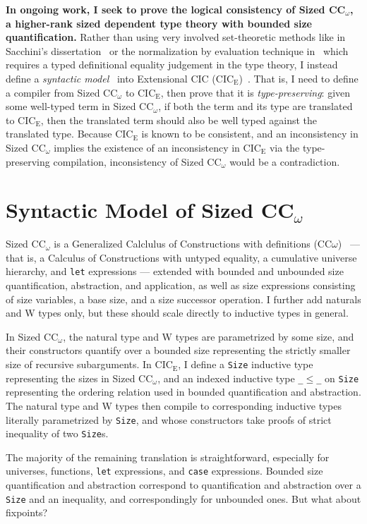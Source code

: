 \documentclass[acmsmall,nonacm, screen]{acmart}
\newcommand{\lang}{Sized CC$_\omega$\xspace}
\newcommand{\CICE}{CIC$_\mathrm{E}$\xspace}
\newcommand{\we}{I\xspace}
\newcommand{\We}{I\xspace}
\begin{document}
\textbf{In ongoing work, \we seek to prove the logical consistency of \lang,
a higher-rank sized dependent type theory with bounded size quantification.}
Rather than using very involved set-theoretic methods like in Sacchini's dissertation~\citep{cic-hat-minus}
or the normalization by evaluation technique in~\citet{nbe-sized}
which requires a typed definitional equality judgement in the type theory,
\we instead define a \emph{syntactic model}~\citep{syntactic-models} into Extensional CIC (\CICE)~\citep{CCE}.
That is, \we need to define a compiler from \lang to \CICE, then prove that it is \emph{type-preserving}:
given some well-typed term in \lang, if both the term and its type are translated to \CICE,
then the translated term should also be well typed against the translated type.
Because \CICE is known to be consistent, and an inconsistency in \lang
implies the existence of an inconsistency in \CICE via the type-preserving compilation,
inconsistency of \lang would be a contradiction.

\section{Syntactic Model of \texorpdfstring{\lang}{Sized CCω}}

\lang is a Generalized Calclulus of Constructions with definitions (CC$\omega$)~\citep{universes} ---
that is, a Calculus of Constructions with untyped equality, a cumulative universe hierarchy, and \texttt{let} expressions ---
extended with bounded and unbounded size quantification, abstraction, and application,
as well as size expressions consisting of size variables, a base size, and a size successor operation.
\We further add naturals and W types only, but these should scale directly to inductive types in general.

In \lang, the natural type and W types are parametrized by some size, and their constructors quantify
over a bounded size representing the strictly smaller size of recursive subarguments.
In \CICE, \we define a \texttt{Size} inductive type representing the sizes in \lang,
and an indexed inductive type \texttt{\_$\leqslant$\_} on \texttt{Size}
representing the ordering relation used in bounded quantification and abstraction.
The natural type and W types then compile to corresponding inductive types literally parametrized by \texttt{Size},
and whose constructors take proofs of strict inequality of two \texttt{Size}s.

The majority of the remaining translation is straightforward,
especially for universes, functions, \texttt{let} expressions, and \texttt{case} expressions.
Bounded size quantification and abstraction correspond to quantification and abstraction
over a \texttt{Size} and an inequality, and correspondingly for unbounded ones.
But what about fixpoints?
\end{document}
